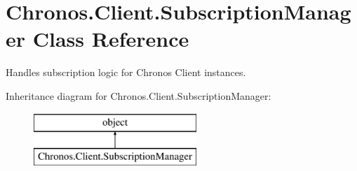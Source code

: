 \hypertarget{classChronos_1_1Client_1_1SubscriptionManager}{}\section{Chronos.\+Client.\+Subscription\+Manager Class Reference}
\label{classChronos_1_1Client_1_1SubscriptionManager}


Handles subscription logic for Chronos Client instances.  


Inheritance diagram for Chronos.\+Client.\+Subscription\+Manager\+:\begin{figure}[H]
\begin{center}
\leavevmode
\includegraphics[height=2.000000cm]{classChronos_1_1Client_1_1SubscriptionManager}
\end{center}
\end{figure}
